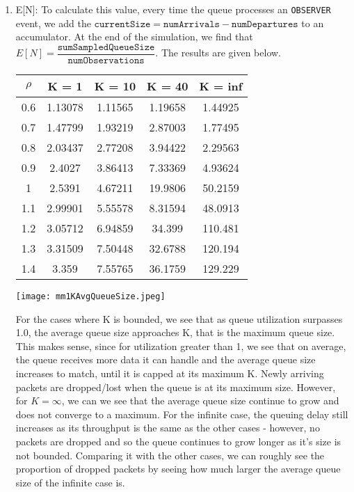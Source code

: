 \documentclass{article}
\begin{document}
\begin{enumerate}
    \item E[N]: To calculate this value, every time the queue processes an \texttt{OBSERVER} event,
        we add the $\texttt{currentSize} = \texttt{numArrivals} - \texttt{numDepartures}$
        to an accumulator. At the end of the simulation, we find that $E[N] =
        \dfrac{\texttt{sumSampledQueueSize}}{\texttt{numObservations}}$. The results are given below. \newline
    \begin{center}
        \begin{tabular}{||c c c c c||}
        \hline
        $\rho$ & K = 1 & K = 10 & K = 40 & K = inf \\ [0.5ex]
        \hline\hline
        0.6 & 1.13078 & 1.11565 & 1.19658 & 1.44925 \\
        \hline
        0.7 & 1.47799 & 1.93219 & 2.87003 & 1.77495 \\
        \hline
        0.8 & 2.03437 & 2.77208 & 3.94422 & 2.29563 \\
        \hline
        0.9 & 2.4027 & 3.86413 & 7.33369 & 4.93624 \\
        \hline
        1 & 2.5391 & 4.67211 & 19.9806 & 50.2159 \\
        \hline
        1.1 & 2.99901 & 5.55578 & 8.31594 & 48.0913 \\
        \hline
        1.2 & 3.05712 & 6.94859 & 34.399 & 110.481 \\
        \hline
        1.3 & 3.31509 & 7.50448 & 32.6788 & 120.194 \\
        \hline
        1.4 & 3.359 & 7.55765 & 36.1759 & 129.229 \\
        \hline
        \end{tabular}
    \end{center}
    \texttt{[image: mm1KAvgQueueSize.jpeg]}

    For the cases where K is bounded, we see that as queue utilization surpasses 1.0, the average queue size approaches K, that is the maximum queue size.
    This makes sense, since for utilization greater than 1, we see that on average, the queue receives more data it can handle and the average queue size increases
    to match, until it is capped at its maximum K.
    Newly arriving packets are dropped/lost when the queue is at its maximum size.
    However, for $K=\infty$, we can we see that the average queue size continue to grow and does not converge to a
    maximum. For the infinite case, the queuing delay still increases as its throughput is the same as the other cases - however, no packets are dropped and so the queue
    continues to grow longer as it's size is not bounded. Comparing it with the other cases, we can roughly see the proportion of dropped packets by seeing how much
    larger the average queue size of the infinite case is.


\end{enumerate}
\end{document}
